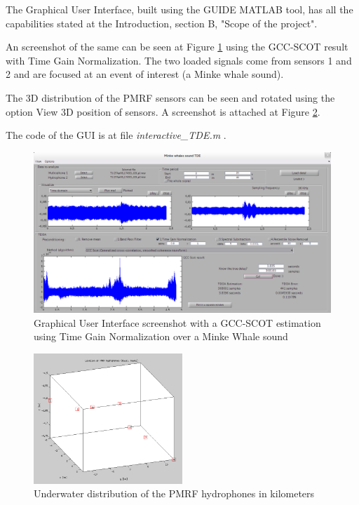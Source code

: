 The Graphical User Interface, built using the GUIDE MATLAB tool, has all the capabilities stated at the Introduction, section B, "Scope of the project".

An screenshot of the same can be seen at Figure \ref{fig:GUI} using the GCC-SCOT result with Time Gain Normalization. The two loaded signals come from sensors 1 and 2 and are focused at an event of interest (a Minke whale sound).

The 3D distribution of the PMRF sensors can be seen and rotated using the option View 3D position of sensors. A screenshot is attached at Figure \ref{fig:3D_sensors}.

The code of the GUI is at file \emph{interactive\_TDE.m}\cite{gui} .

\begin{figure}[!t]
	\begin{center}
		\includegraphics[width=1\textwidth]{figures/GUI_SCOT.png}
	\end{center}
	\caption{Graphical User Interface screenshot with a GCC-SCOT estimation using Time Gain Normalization over a Minke Whale sound}
	\label{fig:GUI}
\end{figure}

\begin{figure}[htb]
	\begin{center}
		\includegraphics[width=0.5\textwidth]{figures/3D_sensors.png}
	\end{center}
	\caption{Underwater distribution of the PMRF hydrophones in kilometers}
	\label{fig:3D_sensors}
\end{figure}
